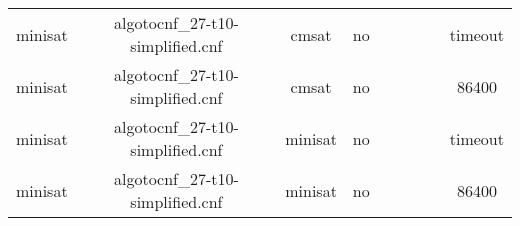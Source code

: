 \begin{appendices}
\begin{table}[p]
\begin{center}
\begin{tabular}{l|cccccccc}
  minisat                        & algotocnf\_27-t10-simplified.cnf & cmsat      & no    &            &           &           &            & timeout \\ %
  minisat                        & algotocnf\_27-t10-simplified.cnf & cmsat      & no    &            &           &           &            & 86400 \\ %
  minisat                        & algotocnf\_27-t10-simplified.cnf & minisat    & no    &            &           &           &            & timeout \\ %
  minisat                        & algotocnf\_27-t10-simplified.cnf & minisat    & no    &            &           &           &            & 86400 \\ %
    \end{tabular}
  \end{center}
\end{table}

\newpage


\end{appendices}
